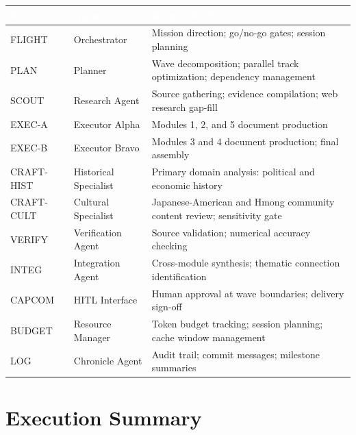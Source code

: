 \documentclass[11pt,letterpaper]{article}
\newcommand{\tableheader}[1]{\textbf{\sffamily\textcolor{white}{#1}}}
\begin{document}
\begin{center}
\begin{tabularx}{\textwidth}{L{2cm}L{3.5cm}X}
\toprule
{}
\tableheader{Role} & \tableheader{Agent} & \tableheader{Responsibility} \\
\midrule
FLIGHT & Orchestrator & Mission direction; go/no-go gates; session planning \\
PLAN & Planner & Wave decomposition; parallel track optimization; dependency management \\
SCOUT & Research Agent & Source gathering; evidence compilation; web research gap-fill \\
EXEC-A & Executor Alpha & Modules 1, 2, and 5 document production \\
EXEC-B & Executor Bravo & Modules 3 and 4 document production; final assembly \\
CRAFT-HIST & Historical Specialist & Primary domain analysis: political and economic history \\
CRAFT-CULT & Cultural Specialist & Japanese-American and Hmong community content review; sensitivity gate \\
VERIFY & Verification Agent & Source validation; numerical accuracy checking \\
INTEG & Integration Agent & Cross-module synthesis; thematic connection identification \\
CAPCOM & HITL Interface & Human approval at wave boundaries; delivery sign-off \\
BUDGET & Resource Manager & Token budget tracking; session planning; cache window management \\
LOG & Chronicle Agent & Audit trail; commit messages; milestone summaries \\
\bottomrule
\end{tabularx}
\end{center}

\section{Execution Summary}
\end{document}
